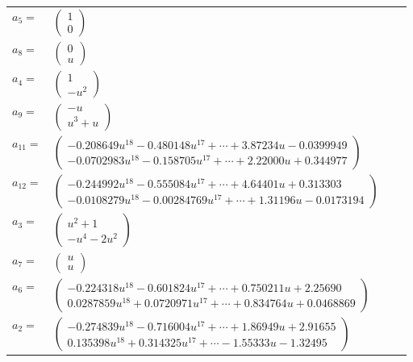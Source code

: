 \documentclass[1p]{elsarticle_modified}
\theoremstyle{definition}
\begin{document}
\begin{tabular}{m{7pt} m{180pt} m{7pt} m{180pt} }
\flushright $a_{5}=$&$\begin{pmatrix}1\\0\end{pmatrix}$ \\
\flushright $a_{8}=$&$\begin{pmatrix}0\\u\end{pmatrix}$ \\
\flushright $a_{4}=$&$\begin{pmatrix}1\\- u^2\end{pmatrix}$ \\
\flushright $a_{9}=$&$\begin{pmatrix}- u\\u^3+u\end{pmatrix}$ \\
\flushright $a_{11}=$&$\begin{pmatrix}-0.208649 u^{18}-0.480148 u^{17}+\cdots+3.87234 u-0.0399949\\-0.0702983 u^{18}-0.158705 u^{17}+\cdots+2.22000 u+0.344977\end{pmatrix}$ \\
\flushright $a_{12}=$&$\begin{pmatrix}-0.244992 u^{18}-0.555084 u^{17}+\cdots+4.64401 u+0.313303\\-0.0108279 u^{18}-0.00284769 u^{17}+\cdots+1.31196 u-0.0173194\end{pmatrix}$ \\
\flushright $a_{3}=$&$\begin{pmatrix}u^2+1\\- u^4-2 u^2\end{pmatrix}$ \\
\flushright $a_{7}=$&$\begin{pmatrix}u\\u\end{pmatrix}$ \\
\flushright $a_{6}=$&$\begin{pmatrix}-0.224318 u^{18}-0.601824 u^{17}+\cdots+0.750211 u+2.25690\\0.0287859 u^{18}+0.0720971 u^{17}+\cdots+0.834764 u+0.0468869\end{pmatrix}$ \\
\flushright $a_{2}=$&$\begin{pmatrix}-0.274839 u^{18}-0.716004 u^{17}+\cdots+1.86949 u+2.91655\\0.135398 u^{18}+0.314325 u^{17}+\cdots-1.55333 u-1.32495\end{pmatrix}$ \\

\end{tabular}
\end{document}
